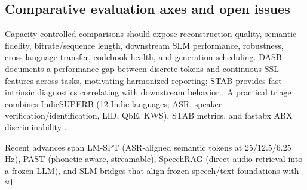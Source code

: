 \subsection{Comparative evaluation axes and open issues} \label{subsec:Comparative evaluation axes and open issues}
Capacity‑controlled comparisons should expose reconstruction quality, semantic fidelity, bitrate/sequence length, downstream SLM performance, robustness, cross‑language transfer, codebook health, and generation scheduling. DASB documents a performance gap between discrete tokens and continuous SSL features across tasks, motivating harmonized reporting; STAB provides fast intrinsic diagnostics correlating with downstream behavior \cite{mousavi2024dasbdiscreteaudiospeechbenchmark,vashishth2024stabspeechtokenizerassessmentbenchmark}. A practical triage combines IndicSUPERB (12 Indic languages; ASR, speaker verification/identification, LID, QbE, KWS), STAB metrics, and fastabx ABX discriminability \cite{vashishth2024stabspeechtokenizerassessmentbenchmark,poli2025fastabxlibraryefficientcomputationabxdis,entry2025indicsuperbspeechprocessinguniversalperf}.

Recent advances span LM‑SPT (ASR‑aligned semantic tokens at 25/12.5/6.25 Hz), PAST (phonetic‑aware, streamable), SpeechRAG (direct audio retrieval into a frozen LLM), and SLM bridges that align frozen speech/text foundations with ≈1%

